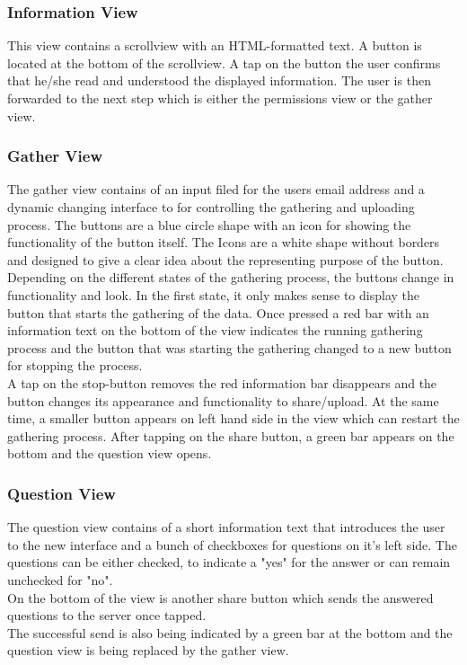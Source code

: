 \subsubsection{Information View}
This view contains a scrollview with an HTML-formatted text. A button is located at the bottom of the scrollview. A tap on the button the user confirms that he/she read and understood the displayed information. The user is then forwarded to the next step which is either the permissions view or the gather view. 

\subsubsection{Gather View}
The gather view contains of an input filed for the users email address and a dynamic changing interface to for controlling the gathering and uploading process. The buttons are a blue circle shape with an icon for showing the functionality of the button itself. The Icons are a white shape without borders and designed to give a clear idea about the representing purpose of the button. 
Depending on the different states of the gathering process, the buttons change in functionality and look. In the first state, it only makes sense to display the button that starts the gathering of the data. Once pressed a red bar with an information text on the bottom of the view indicates the running gathering process and the button that was starting the gathering changed to a new button for stopping the process.\\
A tap on the stop-button removes the red information bar disappears and the button changes its appearance and functionality to share/upload.
At the same time, a smaller button appears on left hand side in the view which can restart the gathering process. 
After tapping on the share button, a green bar appears on the bottom and the question view opens. 

\subsubsection{Question View}
The question view contains of a short information text that introduces the user to the new interface and a bunch of checkboxes for questions on it's left side. 
The questions can be either checked, to indicate a "yes" for the answer or can remain unchecked for "no".\\
On the bottom of the view is another share button which sends the answered questions to the server once tapped.\\
The successful send is also being indicated by a green bar at the bottom and the question view is being replaced by the gather view. 

